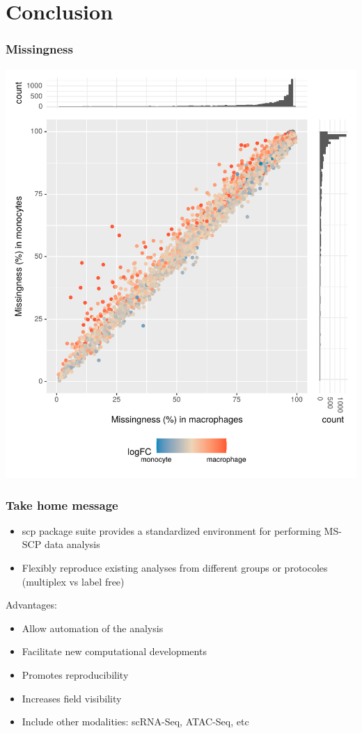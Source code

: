 \documentclass{beamer}
\newcommand{\hcode}[2][lgray]{{\ttfamily\color{vdgray}\colorbox{#1}{#2}}}
\newcommand{\frametitlesection}[1]{\frametitle{\centering #1 \footnotesize \hspace{0pt plus 1 filll} \insertsection}}
\begin{document}
\section{Conclusion}

\begin{frame}
    \frametitlesection{Missingness}
    
    \centering
    \includegraphics[width=.7\linewidth]{figs/missingness.pdf}
    
\end{frame}

\begin{frame}
    \frametitlesection{Take home message}
    
    \begin{itemize}
        \item{\hcode{scp} package suite provides a standardized environment for 
        performing MS-SCP data analysis}
        \item{Flexibly reproduce existing analyses from different groups or 
        protocoles (multiplex vs label free)}
    \end{itemize}
    
    \bigskip
    
    Advantages:
    
    \begin{itemize}
        \item{Allow automation of the analysis}
        \item{Facilitate new computational developments}
        \item{Promotes reproducibility}
        \item{Increases field visibility}
        \item{Include other modalities: scRNA-Seq, ATAC-Seq, etc}
    \end{itemize}
    
\end{frame}
\end{document}
